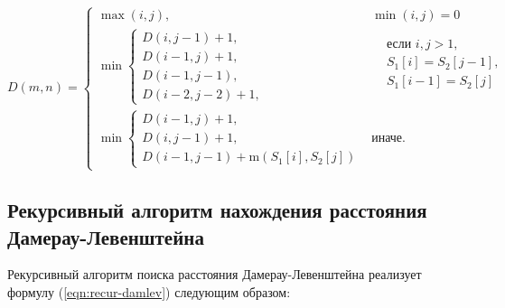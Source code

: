 \begin{equation}
    \label{eqn:recur-damlev}
    D(m, n) = 
    \begin{cases}
        \max(i, j), &\min(i, j) = 0\\
        \min
        \begin{cases}
            D(i, j - 1) + 1,\\
            D(i - 1, j) + 1,\\
            D(i - 1, j - 1),\\
            D(i - 2, j - 2) + 1,
        \end{cases} 
        &\begin{aligned}
			& \text{если $i, j > 1$},\\
			& S_{1}[i] = S_{2}[j - 1],\\
			& S_{1}[i - 1] = S_{2}[j]\\
		\end{aligned}\\
        \min
        \begin{cases}
            D(i - 1, j) + 1,\\
            D(i, j - 1) + 1,\\
            D(i - 1, j - 1) + \text{m}(S_1[i], S_2[j])
        \end{cases} &\text{иначе.}
    \end{cases}
\end{equation}

\subsection{Рекурсивный алгоритм нахождения рассто\-яния Дамерау-Левенштейна}

Рекурсивный алгоритм поиска расстояния Дамерау-Левенштейна реализует формулу (\ref{eqn:recur-damlev}) следующим образом:

